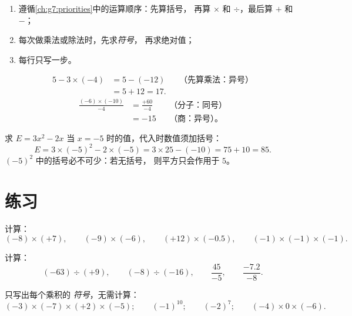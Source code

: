\begin{method}[正负数计算的稳妥方法]\label{met:g8:negprod:compute}
\begin{enumerate}
  \item 遵循\cref{ch:g7:priorities}中的运算顺序：先算括号，
        再算 $\times$ 和 $\div$，最后算 $+$ 和 $-$；
  \item 每次做乘法或除法时，先求\emph{符号}，
        再求绝对值；
  \item 每行只写一步。
\end{enumerate}
\end{method}

\begin{example}\label{ex:g8:negprod:compute}
\begin{align*}
5 - 3 \times (-4)
&= 5 - (-12) && \text{（先算乘法：异号）}\\
&= 5 + 12 = 17 .
\end{align*}
\begin{align*}
\frac{(-6) \times (-10)}{-4}
&= \frac{+60}{-4} && \text{（分子：同号）}\\
&= -15 && \text{（商：异号）。}
\end{align*}
\end{example}

\begin{example}[代入负数求值]\label{ex:g8:negprod:substitute}
求 $E = 3x^2 - 2x$ 当 $x = -5$ 时的值，代入时数值须加括号：
\[
E = 3 \times (-5)^2 - 2 \times (-5)
= 3 \times 25 - (-10)
= 75 + 10 = 85 .
\]
$(-5)^2$ 中的括号必不可少：若无括号，
则平方只会作用于 $5$。
\end{example}

\section{练习}

\begin{exercise}[$\star$]\label{exo:g8:negprod:1}
计算：
\[
(-8) \times (+7), \qquad
(-9) \times (-6), \qquad
(+12) \times (-0.5), \qquad
(-1) \times (-1) \times (-1).
\]
\end{exercise}

\begin{exercise}[$\star$]\label{exo:g8:negprod:2}
计算：
\[
(-63) \div (+9), \qquad
(-8) \div (-16), \qquad
\frac{45}{-5}, \qquad
\frac{-7.2}{-8} .
\]
\end{exercise}

\begin{exercise}[$\star$]\label{exo:g8:negprod:3}
只写出每个乘积的 \emph{符号}，无需计算：
\[
(-3) \times (-7) \times (+2) \times (-5); \qquad
(-1)^{10}; \qquad
(-2)^{7}; \qquad
(-4) \times 0 \times (-6).
\]
\end{exercise}

